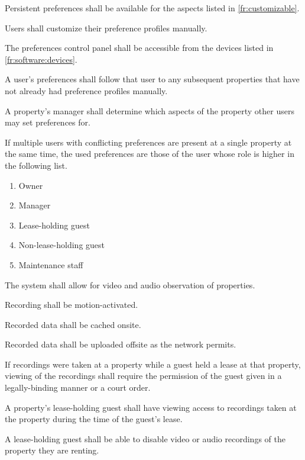 \documentclass[letter,titlepage,oneside,english]{report}
\begin{document}
\begin{fr}
\begin{fr}
  \item
    Persistent preferences shall be available for the aspects listed in \ref{fr:customizable}.
  \item
    Users shall customize their preference profiles manually.
  \item
    The preferences control panel shall be accessible from the devices listed in \ref{fr:software:devices}.
  \item
    A user's preferences shall follow that user to any subsequent properties that have not already had preference profiles manually.
  \item
    A property's manager shall determine which aspects of the property other users may set preferences for.
  \item
    If multiple users with conflicting preferences are present at a single property at the same time, the used preferences are those of the user whose role is higher in the following list.
    \begin{enumerate}
    \item
      Owner
    \item
      Manager
    \item
      Lease-holding guest
    \item
      Non-lease-holding guest
    \item
      Maintenance staff
    \end{enumerate}
  \end{fr}
\item
  The system shall allow for video and audio observation of properties.
  \begin{fr}
  \item
    Recording shall be motion-activated.
  \item
    Recorded data shall be cached onsite.
  \item
    Recorded data shall be uploaded offsite as the network permits.
  \item
    If recordings were taken at a property while a guest held a lease at that property, viewing of the recordings shall require the permission of the guest given in a legally-binding manner or a court order.
  \item
    A property's lease-holding guest shall have viewing access to recordings taken at the property during the time of the guest's lease.
  \item
    A lease-holding guest shall be able to disable video or audio recordings of the property they are renting.
    \begin{fr}

\end{fr}
\end{fr}
\end{fr}
\end{document}
